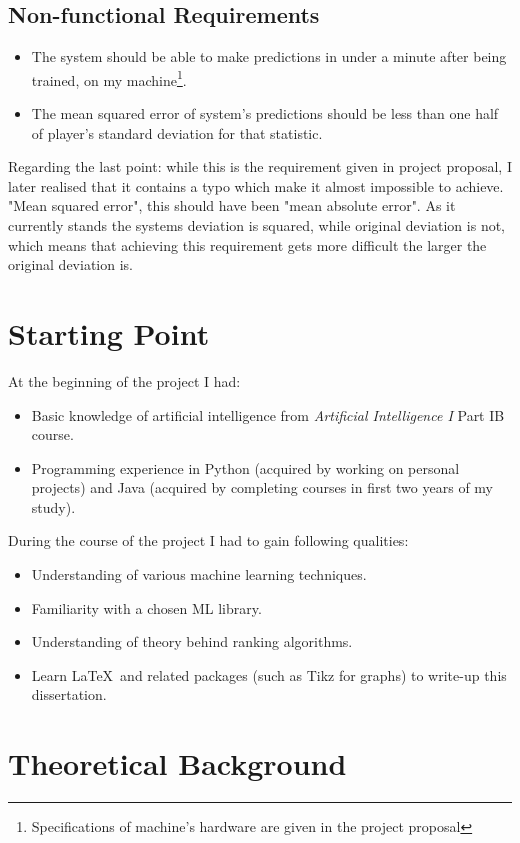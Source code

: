 \documentclass[12pt,a4paper]{book}
\begin{document}
\subsection{Non-functional Requirements}
\begin{itemize}
\item The system should be able to make predictions in under a minute after being trained, on my machine\footnote{Specifications of machine's hardware are given in the project proposal}.
\item The mean squared error of system's predictions should be less than one half of player's standard deviation for that statistic.
\end{itemize}
Regarding the last point: while this is the requirement given in project proposal, I later realised that it contains a typo which make it almost impossible to achieve.
"Mean squared error", this should have been "mean absolute error".
As it currently stands the systems deviation is squared, while original deviation is not, which means that achieving this requirement gets more difficult the larger the original deviation is.
\section{Starting Point}
\noindent
At the beginning of the project I had:
\begin{itemize}
\item Basic knowledge of artificial intelligence from \emph{Artificial Intelligence I} Part IB course.
\item Programming experience in Python (acquired by working on personal projects) and Java (acquired by completing courses in first two years of my study).
\end{itemize}
During the course of the project I had to gain following qualities:
\begin{itemize}
\item Understanding of various machine learning techniques.
\item Familiarity with a chosen ML library.
\item Understanding of theory behind ranking algorithms.
\item Learn \LaTeX\ and related packages (such as Tikz for graphs) to write-up this dissertation.
\end{itemize}
\section{Theoretical Background}
\end{document}
